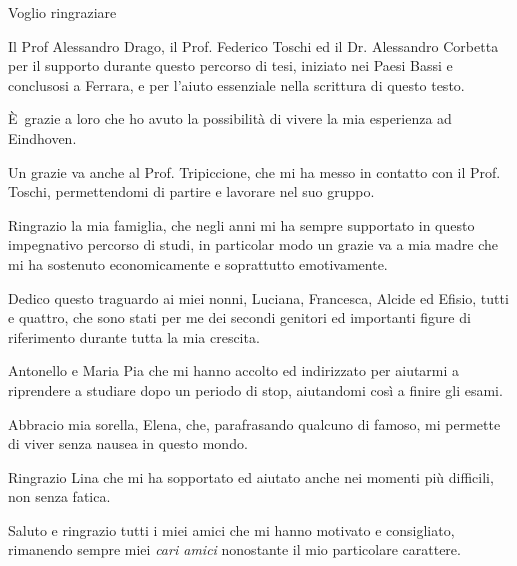 \documentclass{standalone}
\begin{document}
Voglio ringraziare 

Il Prof Alessandro Drago, il Prof. Federico Toschi ed il Dr. Alessandro Corbetta per il supporto durante questo percorso di tesi, iniziato nei Paesi Bassi e conclusosi a Ferrara, e per l'aiuto essenziale nella scrittura di questo testo.

È grazie a loro che ho avuto la possibilità di vivere la mia esperienza ad Eindhoven.

Un grazie va anche al Prof. Tripiccione, che mi ha messo in contatto con il Prof. Toschi, permettendomi di partire e lavorare nel suo gruppo.

Ringrazio la mia famiglia, che negli anni mi ha sempre supportato in questo impegnativo percorso di studi, in particolar modo un grazie va a mia madre che mi ha sostenuto economicamente e soprattutto emotivamente.

Dedico questo traguardo ai miei nonni, Luciana, Francesca, Alcide ed Efisio, tutti e quattro, che sono stati per me dei secondi genitori ed importanti figure di riferimento durante tutta la mia crescita.

Antonello e Maria Pia che mi hanno accolto ed indirizzato per aiutarmi a riprendere a studiare dopo un periodo di stop, aiutandomi così a finire gli esami.

Abbracio mia sorella, Elena, che, parafrasando qualcuno di famoso, mi permette di viver senza nausea in questo mondo.

Ringrazio Lina che mi ha sopportato ed aiutato anche nei momenti più difficili, non senza fatica.

Saluto e ringrazio tutti i miei amici che mi hanno motivato e consigliato, rimanendo sempre miei \emph{cari amici} nonostante il mio particolare carattere.
\end{document}
